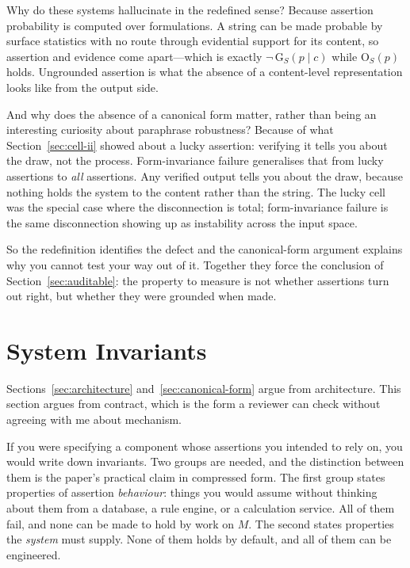 \documentclass[11pt]{article}
\newcommand{\Out}{\mathrm{O}}          %
\newcommand{\Grd}{\mathrm{G}}          %
\theoremstyle{plain}
\theoremstyle{definition}
\begin{document}
Why do these systems hallucinate in the redefined sense? Because assertion
probability is computed over formulations. A string can be made probable by surface
statistics with no route through evidential support for its content, so assertion
and evidence come apart---which is exactly $\neg\,\Grd_S(p \mid c)$ while
$\Out_S(p)$ holds. Ungrounded assertion is what the absence of a content-level
representation looks like from the output side.

And why does the absence of a canonical form matter, rather than being an
interesting curiosity about paraphrase robustness? Because of what
Section~\ref{sec:cell-ii} showed about a lucky assertion: verifying it tells you
about the draw, not the process. Form-invariance failure generalises that from
lucky assertions to \emph{all} assertions. Any verified output tells you about the
draw, because nothing holds the system to the content rather than the string. The
lucky cell was the special case where the disconnection is total; form-invariance
failure is the same disconnection showing up as instability across the input space.

So the redefinition identifies the defect and the canonical-form argument explains
why you cannot test your way out of it. Together they force the conclusion of
Section~\ref{sec:auditable}: the property to measure is not whether assertions turn
out right, but whether they were grounded when made.


\section{System Invariants}
\label{sec:invariants}

Sections~\ref{sec:architecture} and~\ref{sec:canonical-form} argue from
architecture. This section argues from contract, which is the form a reviewer can
check without agreeing with me about mechanism.

If you were specifying a component whose assertions you intended to rely on, you
would write down invariants. Two groups are needed, and the distinction between
them is the paper's practical claim in compressed form. The first group states
properties of assertion \emph{behaviour}: things you would assume without thinking
about them from a database, a rule engine, or a calculation service. All of them
fail, and none can be made to hold by work on $M$. The second states properties the
\emph{system} must supply. None of them holds by default, and all of them can be
engineered.
\end{document}
